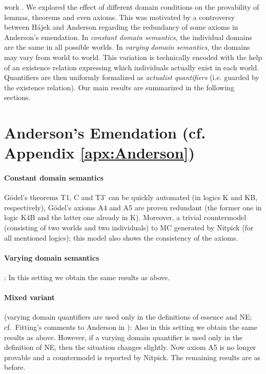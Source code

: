 \documentclass{birkjour}
\theoremstyle{definition}
\theoremstyle{remark}
\numberwithin{equation}{section}
\begin{document}
work \cite{C40,J30,J23}. We explored the effect of different domain conditions
 on the provability of lemmas, theorems and even axioms. This was motivated by a controversy between Hájek and Anderson regarding the redundancy of some axioms in Anderson's emendation. In \emph{constant domain semantics}, the individual domains are the same in all possible worlds. In \emph{varying domain semantics}, the domains may vary from world to world. This variation is technically encoded with the help of an existence relation expressing which individuals actually exist in each world. Quantifiers are then uniformly formalized as \emph{actualist quantifiers} (i.e. guarded by the existence relation). Our main results are summarized in the following sections.



\section{Anderson's Emendation (cf. Appendix \ref{apx:Anderson})}







\paragraph{Constant domain semantics}
     G\"odel's theorems T1, C
  and T3' can be quickly automated (in logics K and KB, respectively),
  G\"odel's axioms A4 and A5 are proven redundant (the former one in
  logic K4B and the latter one already in K). Moreover, a trivial
  countermodel (consisting of two worlds and two individuals) to MC
  generated by Nitpick (for all mentioned logics); this model also
  shows the consistency of the axioms. 

\paragraph{Varying domain semantics}
: In this setting we obtain the
  same results as above.

\paragraph{Mixed variant}
(varying domain
  quantifiers are used only in the definitions of essence and NE;
  cf.~Fitting's comments to Anderson in
  \cite{fitting02:_types_tableaus_god}): Also in this setting we
  obtain the same results as above. However, if a varying domain
  quantifier is used only in the definition of NE, then the
  situation changes slightly. Now axiom A5 is no longer provable and
  a countermodel is reported by Nitpick. The remaining results are as before.
\end{document}
